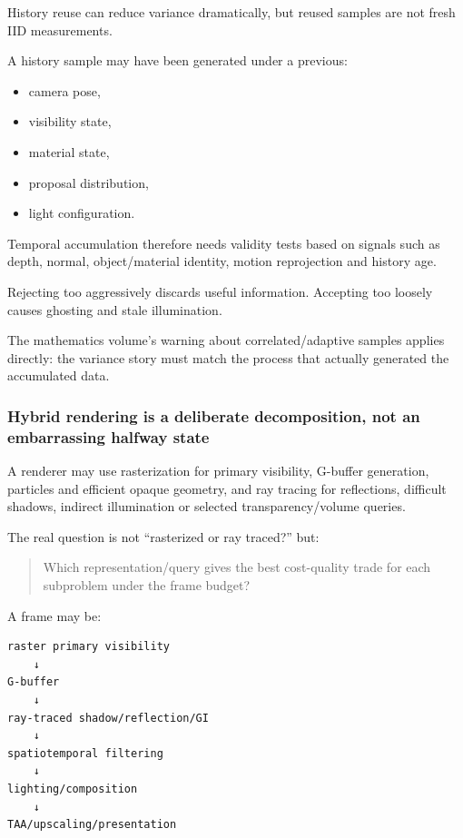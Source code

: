 History reuse can reduce variance dramatically, but reused samples are not fresh IID measurements.

A history sample may have been generated under a previous:

\begin{itemize}
\tightlist
\item
  camera pose,
\item
  visibility state,
\item
  material state,
\item
  proposal distribution,
\item
  light configuration.
\end{itemize}

Temporal accumulation therefore needs validity tests based on signals such as depth, normal, object/material identity, motion reprojection and history age.

Rejecting too aggressively discards useful information. Accepting too loosely causes ghosting and stale illumination.

The mathematics volume's warning about correlated/adaptive samples applies directly: the variance story must match the process that actually generated the accumulated data.

\subsubsection{Hybrid rendering is a deliberate decomposition, not an embarrassing halfway state}\label{03-visual-computing-i-ch001-hybrid-rendering-is-a-deliberate-decomposition-not-an-embarrassing-halfway-state}

A renderer may use rasterization for primary visibility, G-buffer generation, particles and efficient opaque geometry, and ray tracing for reflections, difficult shadows, indirect illumination or selected transparency/volume queries.

The real question is not ``rasterized or ray traced?'' but:

\begin{quote}
Which representation/query gives the best cost-quality trade for each subproblem under the frame budget?
\end{quote}

A frame may be:

\begin{verbatim}
raster primary visibility
    ↓
G-buffer
    ↓
ray-traced shadow/reflection/GI
    ↓
spatiotemporal filtering
    ↓
lighting/composition
    ↓
TAA/upscaling/presentation
\end{verbatim}

